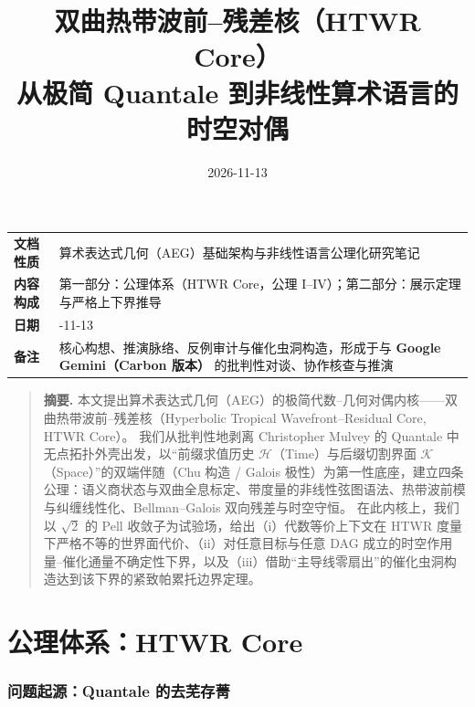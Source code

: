 \documentclass[11pt,a4paper]{ctexart}
\title{\bfseries 双曲热带波前--残差核（HTWR Core）\\[2pt]
\large 从极简 Quantale 到非线性算术语言的时空对偶}
\author{}
\date{2026-11-13}
\theoremstyle{plain}
\theoremstyle{definition}
\newcommand{\cH}{\mathcal{H}}
\newcommand{\cK}{\mathcal{K}}
\begin{document}
\maketitle

\begin{center}
\small
\begin{tabular}{@{}>{\raggedright\arraybackslash}p{2.0cm}>{\raggedright\arraybackslash}p{}@{}}
\toprule
\textbf{文档性质} & 算术表达式几何（AEG）基础架构与非线性语言公理化研究笔记 \\
\textbf{内容构成} & 第一部分：公理体系（HTWR Core，公理 I--IV）；第二部分：展示定理与严格上下界推导 \\
\textbf{日期} & 2026-11-13 \\
\textbf{备注} & 核心构想、推演脉络、反例审计与催化虫洞构造，形成于与 \textbf{Google Gemini（Carbon 版本）} 的批判性对谈、协作核查与推演 \\
\bottomrule
\end{tabular}
\end{center}

\vspace{0.6em}

\begin{quote}\small
\textbf{摘要.}
本文提出算术表达式几何（AEG）的极简代数--几何对偶内核——双曲热带波前--残差核（Hyperbolic Tropical Wavefront--Residual Core, HTWR Core）。
我们从批判性地剥离 Christopher Mulvey 的 Quantale 中无点拓扑外壳出发，以“前缀求值历史 $\cH$（Time）与后缀切割界面 $\cK$（Space）”的双端伴随（Chu 构造 / Galois 极性）为第一性底座，建立四条公理：语义商状态与双曲全息标定、带度量的非线性弦图语法、热带波前模与纠缠线性化、Bellman--Galois 双向残差与时空守恒。
在此内核上，我们以 $\sqrt{2}$ 的 Pell 收敛子为试验场，给出（i）代数等价上下文在 HTWR 度量下严格不等的世界面代价、（ii）对任意目标与任意 DAG 成立的时空作用量--催化通量不确定性下界，以及（iii）借助“主导线零扇出”的催化虫洞构造达到该下界的紧致帕累托边界定理。
\end{quote}

\tableofcontents

\bigskip

\part{公理体系：HTWR Core}

\section{问题起源：Quantale 的去芜存菁}
\end{document}
